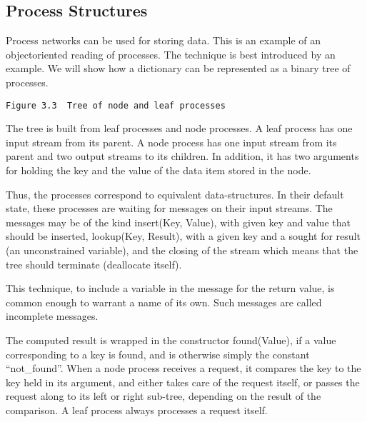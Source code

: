 \subsection{Process Structures}

Process networks can be used for storing data.  This is an example of
an object\-oriented reading of processes.  The technique is best
introduced by an example.  We will show how a dictionary can be
represented as a binary tree of processes.
                                                     
\verb|Figure 3.3  Tree of node and leaf processes|

The tree is built from {\prog leaf} processes and {\prog node}
processes.  A {\prog leaf} process has one input stream from its
parent.  A {\prog node} process has one input stream from its parent
and two output streams to its children.  In addition, it has two
arguments for holding the key and the value of the data item stored in
the node.

Thus, the processes correspond to equivalent data-structures.  In
their default state, these processes are waiting for messages on their
input streams.  The messages may be of the kind {\prog insert(Key,
Value)}, with given key and value that should be inserted, {\prog
lookup(Key, Result)}, with a given key and a sought for result (an
unconstrained variable), and the closing of the stream which means
that the tree should terminate (deallocate itself).

This technique, to include a variable in the message for the return
value, is common enough to warrant a name of its own.  Such messages
are called incomplete messages.

The computed result is wrapped in the constructor {\prog
found(Value)}, if a value corresponding to a key is found, and is
otherwise simply the constant ``{\prog not_found}''.  When a {\prog
node} process receives a request, it compares the key to the key held
in its argument, and either takes care of the request itself, or
passes the request along to its left or right sub-tree, depending on
the result of the comparison.  A {\prog leaf} process always processes
a request itself.


